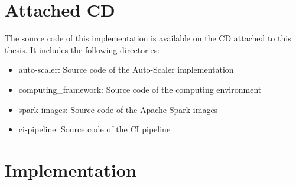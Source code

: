 \chapter{Attached CD}
\label{chap:appendix_cd}
The source code of this implementation is available on the CD attached to this thesis. It includes the following directories:
\begin{itemize}
\item auto-scaler: Source code of the Auto-Scaler implementation
\item computing\_framework: Source code of the computing environment
\item spark-images: Source code of the Apache Spark images
\item ci-pipeline: Source code of the CI pipeline
\end{itemize}

\chapter{Implementation}

